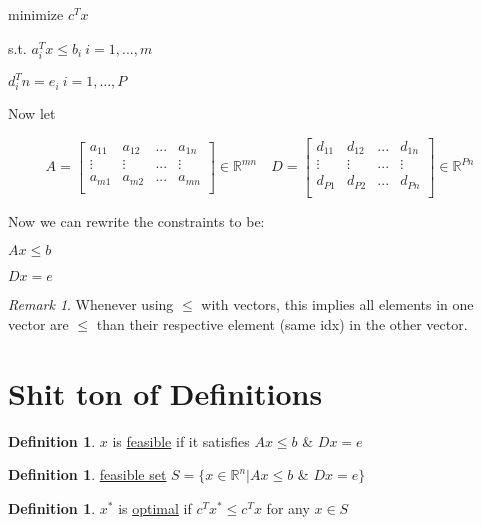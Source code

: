 \documentclass[psamsfonts, 12pt]{amsart}
\theoremstyle{definition}
\newtheorem{defn}[thm]{Definition}
\theoremstyle{remark}
\newtheorem{rem}[thm]{Remark}
\newcommand{\R}{\mathbb{R}}
\begin{document}
\begin{center}
    minimize $c^Tx$
    
    s.t. $a_i^Tx \leq b_i\ i=1,...,m$
    
         $d_i^Tn = e_i\ i=1,...,P$
\end{center}

Now let 

\[
    A = \begin{bmatrix}
        a_{11} & a_{12} & ... & a_{1n}\\
        \vdots & \vdots & ... & \vdots\\
        a_{m1} & a_{m2} & ... & a_{mn}\\
    \end{bmatrix} \in \R^{mn} \quad D = \begin{bmatrix}
        d_{11} & d_{12} & ... & d_{1n}\\
        \vdots & \vdots & ... & \vdots\\
        d_{P1} & d_{P2} & ... & d_{Pn}\\
    \end{bmatrix} \in \R^{Pn}
\]

Now we can rewrite the constraints to be:

\begin{center}
    $Ax \leq b$
    
    $Dx = e$ 
\end{center}

\begin{rem}
Whenever using $\leq$ with vectors, this implies all elements in one vector are $\leq$ than their respective element (same idx) in the other vector.
\end{rem}

\section{Shit ton of Definitions}

\begin{defn}
$x$ is \underline{feasible} if it satisfies $Ax\leq b$ \& $Dx = e$
\end{defn}

\begin{defn}
\underline{feasible set} $S = \{ x\in\R^n |Ax\leq b$ \& $Dx = e \}$
\end{defn}

\begin{defn}
$x^*$ is \underline{optimal} if $c^Tx^* \leq c^Tx$ for any $x\in S$
\end{defn}
\end{document}
